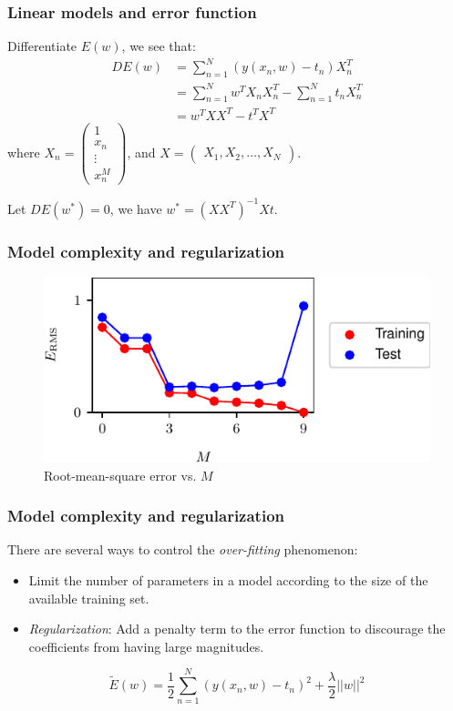 \documentclass{beamer}
\begin{document}
\begin{frame}
    \frametitle{Linear models and error function}
    Differentiate $E(w)$, we see that:
    \begin{equation*}
        \begin{split}
            DE(w)&=\sum_{n=1}^{N}(y(x_{n},w)-t_{n})X_{n}^{T} \\
            &=\sum_{n=1}^{N}w^{T}X_{n}X_{n}^{T}-\sum_{n=1}^{N}t_{n}X_{n}^{T} \\
            &=w^{T}XX^{T}-t^{T}X^{T}
        \end{split}
    \end{equation*}
    where $X_{n}=\begin{pmatrix}
        1 \\
        x_{n} \\
        \vdots \\
        x_{n}^{M}
    \end{pmatrix}$, and $X=\begin{pmatrix}
        X_{1},X_{2},\hdots,X_{N}
    \end{pmatrix}$.
    
    Let $DE(w^{*})=0$, we have $w^{*}=(XX^{T})^{-1}Xt$.
\end{frame}

\begin{frame}
    \frametitle{Model complexity and regularization}
    \begin{figure}
        \caption{Root-mean-square error vs. $M$}
        \includegraphics{Figure_7.pdf}
    \end{figure}
\end{frame}

\begin{frame}
    \frametitle{Model complexity and regularization}
    There are several ways to control the \emph{over-fitting} phenomenon:
    \begin{itemize}
        \item Limit the number of parameters in a model according to the size of the available training set.
        \item \emph{Regularization}: Add a penalty term to the error function to discourage the coefficients from having large magnitudes.
    \end{itemize}
    \begin{equation*}
        \tilde{E}(w)=\frac{1}{2}\sum_{n=1}^{N}(y(x_{n},w)-t_{n})^{2}+\frac{\lambda}{2}||w||^{2}
    \end{equation*}
\end{frame}
\end{document}
